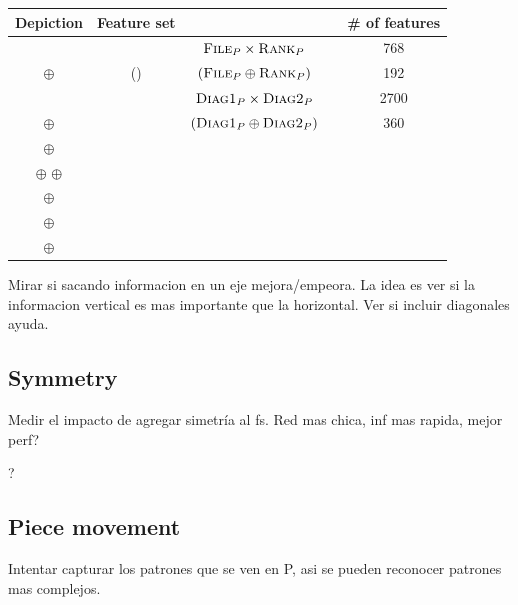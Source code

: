 \begin{tabular}{@{} ccccc @{}} \toprule
Depiction & Feature set &  & \# of features \\
\toprule
{} &  & $\textsc{File}_{P} \times \textsc{Rank}_{P}$ & \rolecolor & 768 \\
\midrule
{} $\oplus$  &  () & $(\textsc{File}_{P} \oplus \textsc{Rank}_{P})$ & \rolecolor & 192 \\
\midrule
{} &  &  $\textsc{Diag1}_{P} \times \textsc{Diag2}_{P}$ & \rolecolor & 2700 \\
\midrule
{} $\oplus$  &  & $(\textsc{Diag1}_{P} \oplus \textsc{Diag2}_{P})$ & \rolecolor & 360 \\
\midrule
{} $\oplus$  &   \\
\midrule
{} $\oplus$  $\oplus$ \\  $\oplus$  &   \\
\midrule
{} $\oplus$  &   \\
\midrule
{} $\oplus$  &   \\
\bottomrule \end{tabular}


Mirar si sacando informacion en un eje mejora/empeora. La idea es ver si la informacion vertical es mas importante que la horizontal. Ver si incluir diagonales ayuda.

\subsection{Symmetry}

Medir el impacto de agregar simetría al fs. Red mas chica, inf mas rapida, mejor perf?

?

\subsection{Piece movement}

Intentar capturar los patrones que se ven en P, asi se pueden reconocer patrones mas complejos.

